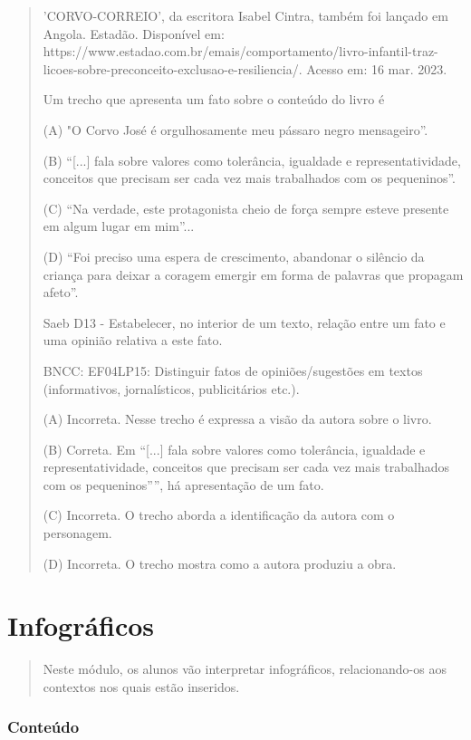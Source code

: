 \begin{itemize}
{{{\begin{itemize}
\begin{itemize}
\begin{itemize}
\begin{quote}
'CORVO-CORREIO', da escritora Isabel Cintra, também foi lançado em
Angola. Estadão. Disponível em:
https://www.estadao.com.br/emais/comportamento/livro-infantil-traz-licoes-sobre-preconceito-exclusao-e-resiliencia/.
Acesso em: 16 mar. 2023.

Um trecho que apresenta um fato sobre o conteúdo do livro é

(A) "O Corvo José é orgulhosamente meu pássaro negro mensageiro''.

(B) \protect\hypertarget{_Hlk129854629}{}{}``{[}...{]} fala sobre
valores como tolerância, igualdade e representatividade, conceitos que
precisam ser cada vez mais trabalhados com os pequeninos''.

(C) ``Na verdade, este protagonista cheio de força sempre esteve
presente em algum lugar em mim''...

(D) ``Foi preciso uma espera de crescimento, abandonar o silêncio da
criança para deixar a coragem emergir em forma de palavras que propagam
afeto''.

Saeb D13 - Estabelecer, no interior de um texto, relação entre um fato e
uma opinião relativa a este fato.

BNCC: EF04LP15: Distinguir fatos de opiniões/sugestões em textos
(informativos, jornalísticos, publicitários etc.).

(A) Incorreta. Nesse trecho é expressa a visão da autora sobre o livro.

(B) Correta. Em ``{[}...{]} fala sobre valores como tolerância,
igualdade e representatividade, conceitos que precisam ser cada vez mais
trabalhados com os pequeninos'''', há apresentação de um fato.

(C) Incorreta. O trecho aborda a identificação da autora com o
personagem.

(D) Incorreta. O trecho mostra como a autora produziu a obra.
\end{quote}

\chapter{Infográficos}

\begin{quote}
Neste módulo, os alunos vão interpretar infográficos, relacionando-os
aos contextos nos quais estão inseridos.
\end{quote}

\subsection{Conteúdo}\label{conteuxfado-8}


\end{itemize}
\end{itemize}
\end{itemize}}}}
\end{itemize}
